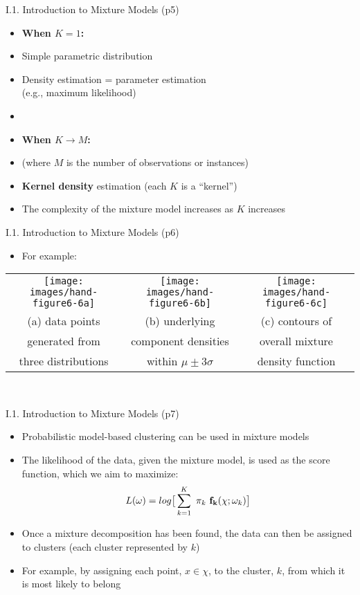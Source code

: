 \documentclass[handout]{beamer}
\newcommand{\strong}[1]{\textbf{\color{teal} #1}}
\begin{document}
\begin{frame}{I.1. Introduction to Mixture Models (p5)}
\begin{itemize}
\item[]\textbf{When $K=1$:}
\item Simple parametric distribution
\item Density estimation = parameter estimation\\
	(e.g., maximum likelihood)
\item[]
\item[]\textbf{When $K \rightarrow M$:}
\item[] (where $M$ is the number of observations or instances)
\item \strong{Kernel density} estimation (each $K$ is a ``kernel'')
\item The complexity of the mixture model increases as $K$ increases
\end{itemize}
\end{frame}
\begin{frame}{I.1. Introduction to Mixture Models (p6)}
\begin{itemize}
\item For example:
\end{itemize}
\begin{center}
\begin{tabular}{ccc}
\texttt{[image: images/hand-figure6-6a]} &
\texttt{[image: images/hand-figure6-6b]} &
\texttt{[image: images/hand-figure6-6c]} \\
(a) data points & 
(b) underlying  & 
(c) contours of \\
generated from &
component densities &
overall mixture \\
three distributions &
within $\mu \pm 3\sigma$ & 
density function \\
\end{tabular}\\
\cite[Figure 6.6]{hand-et-al:2001}
\end{center}
\end{frame}
\begin{frame}{I.1. Introduction to Mixture Models (p7)}
\begin{itemize}
\item Probabilistic model-based clustering can be used in mixture models
\item The likelihood of the data, given the mixture model, is used as the score function, which we aim to maximize:
\[
	L(\omega) = log \big[ \sum_{k=1}^{K} ~ \pi_k ~ {\bf f_k}( \chi; \omega_k) \big]
\]
\item Once a mixture decomposition has been found, the data can then be assigned to clusters (each cluster represented by $k$)
\item For example, by assigning each point, $x \in \chi$, to the cluster, $k$, from which it is most likely to belong
\end{itemize}
\end{frame}
\end{document}
